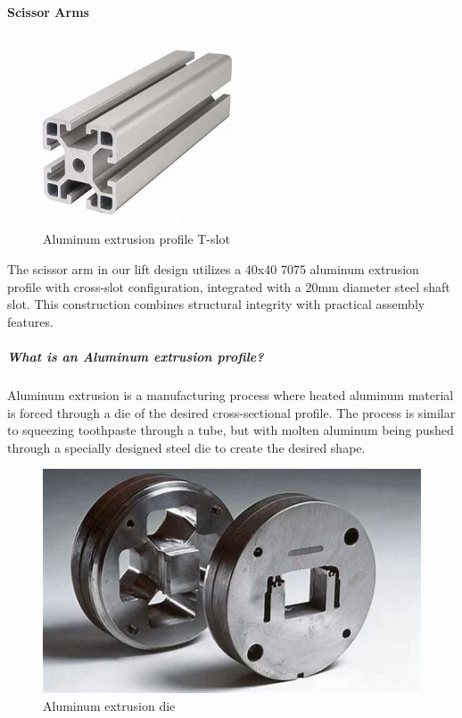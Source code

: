 \documentclass[../../main]{subfiles}
\begin{document}
\paragraph{Scissor Arms}
\begin{figure}[h!]
  \centering
  \includegraphics[width=0.5\textwidth]{img/n1.jpg}
  \caption{Aluminum extrusion profile T-slot}
\end{figure}

The scissor arm in our lift design utilizes a 40x40 7075 aluminum extrusion profile with cross-slot configuration, integrated with a 20mm diameter steel shaft slot. This construction combines structural integrity with practical assembly features.

\subparagraph{What is an Aluminum extrusion profile?}

Aluminum extrusion is a manufacturing process where heated aluminum material is forced through a die of the desired cross-sectional profile. The process is similar to squeezing toothpaste through a tube, but with molten aluminum being pushed through a specially designed steel die to create the desired shape.

\begin{figure}[h!]
  \centering
  \includegraphics[width=\textwidth]{img/n2.jpg}
  \caption{Aluminum extrusion die}
\end{figure}
\end{document}
